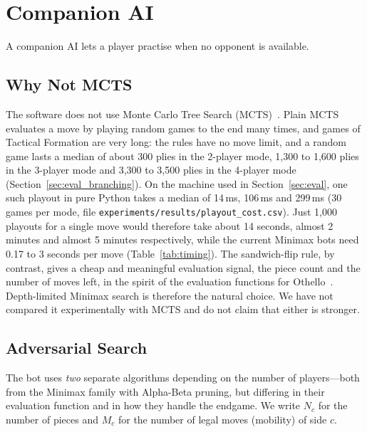 \section{Companion AI}
\label{sec:ai}

A companion AI lets a player practise when no opponent is available.

\subsection{Why Not MCTS}

The software does not use Monte Carlo Tree Search (MCTS)~\citep{browne2012survey}.
Plain MCTS evaluates a move by playing random games to the end many times,
and games of Tactical Formation are very long: the rules have no move limit, and a
random game lasts a median of about 300 plies in the 2-player mode, 1,300 to
1,600 plies in the 3-player mode and 3,300 to 3,500 plies in the 4-player
mode (Section~\ref{sec:eval_branching}). On the machine used in
Section~\ref{sec:eval}, one such playout in pure Python takes a median of
14\,ms, 106\,ms and 299\,ms (30 games per mode, file
\texttt{experiments/results/playout\_cost.csv}). Just 1,000 playouts for a
single move would therefore take about 14 seconds, almost 2 minutes and
almost 5 minutes respectively, while the current Minimax bots need 0.17 to 3 seconds per move
(Table~\ref{tab:timing}). The sandwich-flip rule, by contrast, gives a cheap
and meaningful evaluation signal, the piece count and the number of moves
left, in the spirit of the evaluation functions for Othello~\citep{buro1999how}.
Depth-limited Minimax search is therefore the natural choice. We have not
compared it experimentally with MCTS and do not claim that either is
stronger.

\subsection{Adversarial Search}
\label{ssec:search}

The bot uses \emph{two} separate algorithms depending on the number of
players---both from the Minimax family with Alpha-Beta pruning, but
differing in their evaluation function and in how they handle the endgame.
We write $N_c$ for the number of pieces and $M_c$ for the number of legal
moves (mobility) of side $c$.


